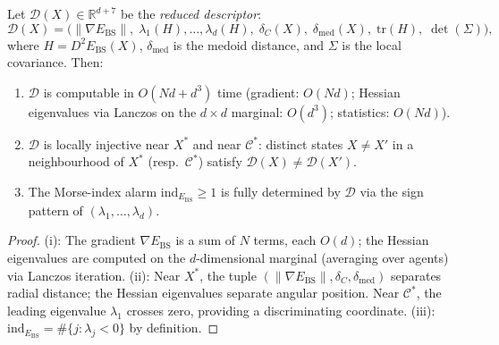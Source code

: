 \documentclass[final]{siamltex}
\newcommand{\R}{\mathbb{R}}
\newcommand{\norm}[1]{\lVert #1 \rVert}
\providecommand{\grad}{\nabla}
\newcommand{\Ebs}{E_{\mathrm{BS}}}
\newcommand{\Cman}{\mathcal{C}^*}
\newcommand{\Xst}{X^*}
\begin{document}
\begin{proposition}\label{prop:reduced}
Let $\mathcal{D}(X)\in\R^{d+7}$ be the \emph{reduced descriptor}:
\begin{equation}\label{eq:reduced}
  \mathcal{D}(X) = \bigl(\norm{\grad\Ebs},\;
  \lambda_1(H),\ldots,\lambda_d(H),\;
  \delta_C(X),\;\delta_{\mathrm{med}}(X),\;
  \mathrm{tr}(H),\;\det(\Sigma)\bigr),
\end{equation}
where $H = D^2\Ebs(X)$, $\delta_{\mathrm{med}}$ is the medoid
distance, and $\Sigma$ is the local covariance.  Then:
\begin{enumerate}
\item[\textup{(i)}] $\mathcal{D}$ is computable in $O(Nd + d^3)$
  time (gradient: $O(Nd)$; Hessian eigenvalues via Lanczos on
  the $d\times d$ marginal: $O(d^3)$; statistics: $O(Nd)$).
\item[\textup{(ii)}] $\mathcal{D}$ is locally injective near
  $\Xst$ and near $\Cman$: distinct states $X \neq X'$ in a
  neighbourhood of $\Xst$ (resp.\ $\Cman$) satisfy
  $\mathcal{D}(X) \neq \mathcal{D}(X')$.
\item[\textup{(iii)}] The Morse-index alarm
  $\mathrm{ind}_{\Ebs} \ge 1$ is fully determined by
  $\mathcal{D}$ via the sign pattern of
  $(\lambda_1,\ldots,\lambda_d)$.
\end{enumerate}
\end{proposition}

\begin{proof}
(i): The gradient $\grad\Ebs$ is a sum of $N$ terms, each $O(d)$;
the Hessian eigenvalues are computed on the $d$-dimensional
marginal (averaging over agents) via Lanczos iteration.
(ii): Near $\Xst$, the tuple $(\norm{\grad\Ebs},\delta_C,
\delta_{\mathrm{med}})$ separates radial distance; the Hessian
eigenvalues separate angular position.  Near $\Cman$, the
leading eigenvalue $\lambda_1$ crosses zero, providing a
discriminating coordinate.
(iii): $\mathrm{ind}_{\Ebs} = \#\{j : \lambda_j < 0\}$ by
definition.
\end{proof}
\end{document}
